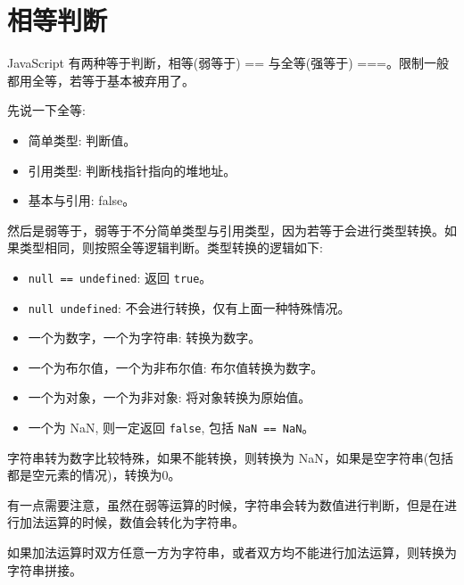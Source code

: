 \section{相等判断}

JavaScript 有两种等于判断，相等(弱等于) == 与全等(强等于) ===。限制一般都用全等，若等于基本被弃用了。

先说一下全等:
\begin{itemize}
  \item 简单类型: 判断值。
  \item 引用类型: 判断栈指针指向的堆地址。
  \item 基本与引用: false。
\end{itemize}

然后是弱等于，弱等于不分简单类型与引用类型，因为若等于会进行类型转换。如果类型相同，则按照全等逻辑判断。类型转换的逻辑如下:
\begin{itemize}
  \item \texttt{null == undefined}: 返回 \texttt{true}。
  \item \texttt{null undefined}: 不会进行转换，仅有上面一种特殊情况。
  \item 一个为数字，一个为字符串: 转换为数字。
  \item 一个为布尔值，一个为非布尔值: 布尔值转换为数字。
  \item 一个为对象，一个为非对象: 将对象转换为原始值。
  \item 一个为 NaN, 则一定返回 \texttt{false}, 包括 \texttt{NaN == NaN}。
\end{itemize}

字符串转为数字比较特殊，如果不能转换，则转换为 NaN，如果是空字符串(包括都是空元素的情况)，转换为0。

有一点需要注意，虽然在弱等运算的时候，字符串会转为数值进行判断，但是在进行加法运算的时候，数值会转化为字符串。

如果加法运算时双方任意一方为字符串，或者双方均不能进行加法运算，则转换为字符串拼接。